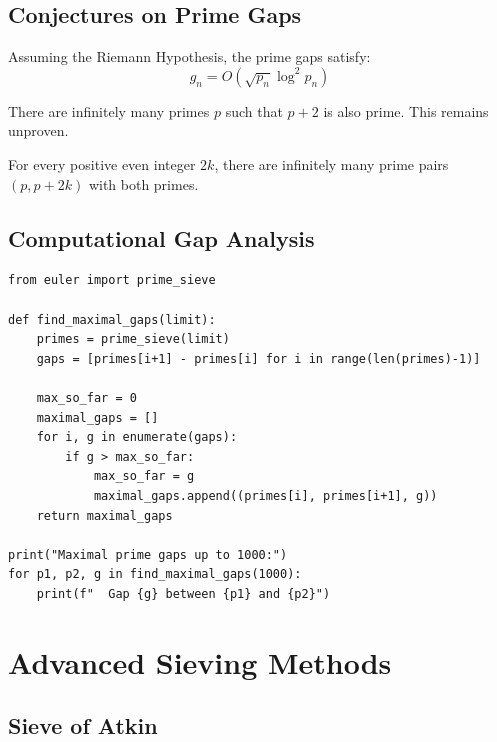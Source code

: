 \subsection{Conjectures on Prime Gaps}

\begin{theorem}
Assuming the Riemann Hypothesis, the prime gaps satisfy:
\[
g_n = O(\sqrt{p_n} \log^2 p_n)
\]
\end{theorem}

\begin{theorem}
There are infinitely many primes $p$ such that $p + 2$ is also prime.
This remains unproven.
\end{theorem}

\begin{theorem}
For every positive even integer $2k$, there are infinitely many prime pairs
$(p, p + 2k)$ with both primes.
\end{theorem}

\subsection{Computational Gap Analysis}

\begin{lstlisting}[caption={Computing maximal gaps}, label=lst:maximal_gaps]
from euler import prime_sieve

def find_maximal_gaps(limit):
    primes = prime_sieve(limit)
    gaps = [primes[i+1] - primes[i] for i in range(len(primes)-1)]
    
    max_so_far = 0
    maximal_gaps = []
    for i, g in enumerate(gaps):
        if g > max_so_far:
            max_so_far = g
            maximal_gaps.append((primes[i], primes[i+1], g))
    return maximal_gaps

print("Maximal prime gaps up to 1000:")
for p1, p2, g in find_maximal_gaps(1000):
    print(f"  Gap {g} between {p1} and {p2}")
\end{lstlisting}

\section{Advanced Sieving Methods}

\subsection{Sieve of Atkin}

